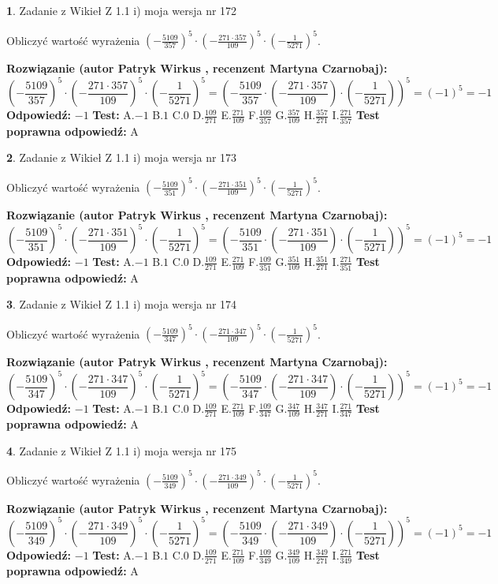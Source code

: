 \documentclass[12pt, a4paper]{article}
\theoremstyle{definition} %
\newtheorem{zad}{}
\newcommand{\zadStart}[1]{\begin{zad}#1\newline}
\newcommand{\zadStop}{\end{zad}}
\newcommand{\rozwStart}[2]{\noindent \textbf{Rozwiązanie (autor #1 , recenzent #2): }\newline}
\newcommand{\rozwStop}{\newline}
\newcommand{\odpStart}{\noindent \textbf{Odpowiedź:}\newline}
\newcommand{\odpStop}{\newline}
\newcommand{\testStart}{\noindent \textbf{Test:}\newline}
\newcommand{\testStop}{\newline}
\newcommand{\kluczStart}{\noindent \textbf{Test poprawna odpowiedź:}\newline}
\newcommand{\kluczStop}{\newline}
\begin{document}
\zadStart{Zadanie z Wikieł Z 1.1 i) moja wersja nr 172}

Obliczyć wartość wyrażenia $(-\frac{5109}{357})^{5} \cdot (-\frac{271 \cdot 357}{109})^{5} \cdot (-\frac{1}{5271})^{5}$.
\zadStop
\rozwStart{Patryk Wirkus}{Martyna Czarnobaj}
$$(-\frac{5109}{357})^{5} \cdot (-\frac{271 \cdot 357}{109})^{5} \cdot (-\frac{1}{5271})^{5} = (-\frac{5109}{357} \cdot (-\frac{271 \cdot 357}{109}) \cdot (-\frac{1}{5271}))^{5} = (-1)^{5} = -1$$
\rozwStop
\odpStart
$-1$
\odpStop
\testStart
A.$-1$ B.$1$ C.$0$ D.$\frac{109}{271}$ E.$\frac{271}{109}$
F.$\frac{109}{357}$ G.$\frac{357}{109}$
H.$\frac{357}{271}$
I.$\frac{271}{357}$
\testStop
\kluczStart
A
\kluczStop



\zadStart{Zadanie z Wikieł Z 1.1 i) moja wersja nr 173}

Obliczyć wartość wyrażenia $(-\frac{5109}{351})^{5} \cdot (-\frac{271 \cdot 351}{109})^{5} \cdot (-\frac{1}{5271})^{5}$.
\zadStop
\rozwStart{Patryk Wirkus}{Martyna Czarnobaj}
$$(-\frac{5109}{351})^{5} \cdot (-\frac{271 \cdot 351}{109})^{5} \cdot (-\frac{1}{5271})^{5} = (-\frac{5109}{351} \cdot (-\frac{271 \cdot 351}{109}) \cdot (-\frac{1}{5271}))^{5} = (-1)^{5} = -1$$
\rozwStop
\odpStart
$-1$
\odpStop
\testStart
A.$-1$ B.$1$ C.$0$ D.$\frac{109}{271}$ E.$\frac{271}{109}$
F.$\frac{109}{351}$ G.$\frac{351}{109}$
H.$\frac{351}{271}$
I.$\frac{271}{351}$
\testStop
\kluczStart
A
\kluczStop



\zadStart{Zadanie z Wikieł Z 1.1 i) moja wersja nr 174}

Obliczyć wartość wyrażenia $(-\frac{5109}{347})^{5} \cdot (-\frac{271 \cdot 347}{109})^{5} \cdot (-\frac{1}{5271})^{5}$.
\zadStop
\rozwStart{Patryk Wirkus}{Martyna Czarnobaj}
$$(-\frac{5109}{347})^{5} \cdot (-\frac{271 \cdot 347}{109})^{5} \cdot (-\frac{1}{5271})^{5} = (-\frac{5109}{347} \cdot (-\frac{271 \cdot 347}{109}) \cdot (-\frac{1}{5271}))^{5} = (-1)^{5} = -1$$
\rozwStop
\odpStart
$-1$
\odpStop
\testStart
A.$-1$ B.$1$ C.$0$ D.$\frac{109}{271}$ E.$\frac{271}{109}$
F.$\frac{109}{347}$ G.$\frac{347}{109}$
H.$\frac{347}{271}$
I.$\frac{271}{347}$
\testStop
\kluczStart
A
\kluczStop



\zadStart{Zadanie z Wikieł Z 1.1 i) moja wersja nr 175}

Obliczyć wartość wyrażenia $(-\frac{5109}{349})^{5} \cdot (-\frac{271 \cdot 349}{109})^{5} \cdot (-\frac{1}{5271})^{5}$.
\zadStop
\rozwStart{Patryk Wirkus}{Martyna Czarnobaj}
$$(-\frac{5109}{349})^{5} \cdot (-\frac{271 \cdot 349}{109})^{5} \cdot (-\frac{1}{5271})^{5} = (-\frac{5109}{349} \cdot (-\frac{271 \cdot 349}{109}) \cdot (-\frac{1}{5271}))^{5} = (-1)^{5} = -1$$
\rozwStop
\odpStart
$-1$
\odpStop
\testStart
A.$-1$ B.$1$ C.$0$ D.$\frac{109}{271}$ E.$\frac{271}{109}$
F.$\frac{109}{349}$ G.$\frac{349}{109}$
H.$\frac{349}{271}$
I.$\frac{271}{349}$
\testStop
\kluczStart
A
\kluczStop
\end{document}

